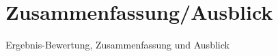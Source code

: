 \chapter{Zusammenfassung/Ausblick}
\label{sec:schluss}
Ergebnis-Bewertung, Zusammenfassung und Ausblick

